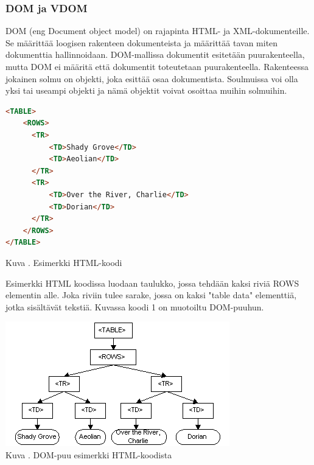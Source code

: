 \subsubsection{DOM ja VDOM}





DOM (eng Document object model) on rajapinta HTML- ja XML-dokumenteille. 
Se määrittää loogisen rakenteen dokumenteista ja määrittää tavan miten dokumenttia hallinnoidaan.
DOM-mallissa dokumentit esitetään puurakenteella, mutta DOM ei määritä että dokumentit toteutetaan puurakenteella.
Rakenteessa jokainen solmu on objekti, joka esittää osaa dokumentista. 
Soulmuissa voi olla yksi tai useampi objekti ja nämä objektit voivat osoittaa muihin solmuihin.
\bigskip



    
\begin{tcolorbox}
\begin{lstlisting}[language=html]
<TABLE>
    <ROWS> 
      <TR> 
          <TD>Shady Grove</TD>
          <TD>Aeolian</TD> 
      </TR> 
      <TR>
          <TD>Over the River, Charlie</TD>
          <TD>Dorian</TD> 
      </TR> 
    </ROWS>
</TABLE>
\end{lstlisting}
\end{tcolorbox}
Kuva \getImgCount. Esimerkki HTML-koodi
\medskip


Esimerkki HTML koodissa luodaan taulukko, jossa tehdään kaksi riviä ROWS elementin alle. 
Joka riviin tulee sarake, jossa on kaksi "table data"{} elementtiä, jotka sisältävät tekstiä.
Kuvassa \nextImageCount {} koodi 1 on muotoiltu DOM-puuhun.


\bigskip
\includegraphics{./src/public/oppar/dom.png}\\
Kuva \getImgCount {}. DOM-puu esimerkki HTML-koodista 
\medskip



